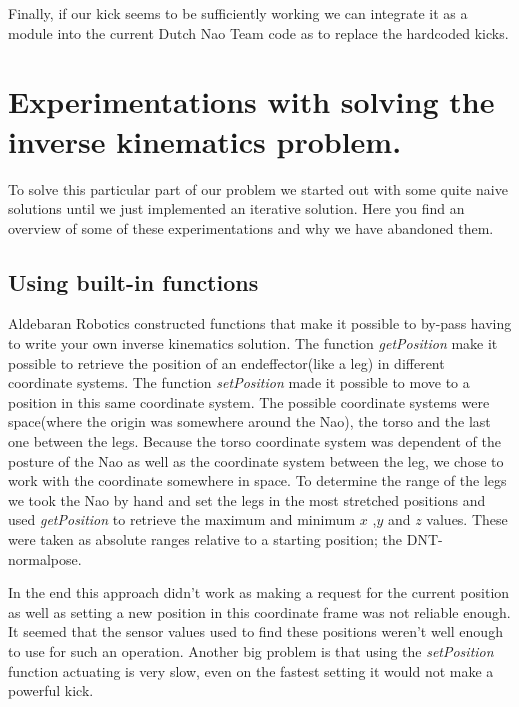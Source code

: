 \documentclass[a4paper]{article}
\begin{document}
Finally, if our kick seems to be sufficiently working we can integrate it as a
module into the current Dutch Nao Team code as to replace the hardcoded kicks.

\appendix
\section{Experimentations with solving the inverse kinematics problem.}
\label{A}
To solve this particular part of our problem we started out with some quite
naive solutions until we just implemented an iterative solution.
Here you find an overview of some of these experimentations and why we have
abandoned them.

\subsection{Using built-in functions}
Aldebaran Robotics constructed functions that make it possible to by-pass having
to write your own inverse kinematics solution. The function \emph{getPosition}
make it possible to retrieve the position of an endeffector(like a leg) in
different coordinate systems. The function  \emph{setPosition} made it possible
to move to a position in this same coordinate system. The possible coordinate
systems were space(where the origin was somewhere around the Nao), the torso
and the last one between the legs. Because the torso coordinate system was
dependent of the posture of the Nao as well as the coordinate system between
the leg, we chose to work with the coordinate somewhere in space.
To determine the range of the legs we took the Nao by hand and set the legs in
the most stretched positions and used \emph{getPosition} to retrieve the
maximum and minimum $x$ ,$y$ and $z$ values.  These were taken as absolute
ranges relative to a starting position; the DNT-normalpose.

In the end this approach didn't work as making a request for the current
position as well as setting a new position in this coordinate frame was not
reliable enough. It seemed that the sensor values used to find these positions
weren't well enough to use for such an operation. Another big problem is that
using the \emph{setPosition} function actuating is very slow, even on the
fastest
setting it would not make a powerful kick.
\end{document}

